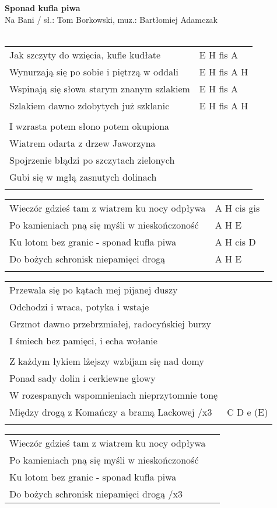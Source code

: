 \documentclass[a5paper]{article}
\begin{document}


\noindent
\fontsize{12pt}{15pt}\selectfont
\textbf{Sponad kufla piwa} \\
\fontsize{8pt}{10pt}\selectfont
Na Bani / sł.: Tom Borkowski, muz.: Bartłomiej Adamczak\\ \\
\fontsize{10pt}{12pt}\selectfont
{}
\begin{tabular}{@{}p{8.50cm}p{3cm}@{}}
\noindent
Jak szczyty do wzięcia, kufle kudłate & E H fis A \\
Wynurzają się po sobie i piętrzą w oddali & E H fis A H \\
Wspinają się słowa starym znanym szlakiem & E H fis A \\
Szlakiem dawno zdobytych już szklanic & E H fis A H \\ \\

I wzrasta potem słono potem okupiona \\
Wiatrem odarta z drzew Jaworzyna \\
Spojrzenie błądzi po szczytach zielonych \\
Gubi się w mgłą zasnutych dolinach \\ \\
\end{tabular}

\noindent
\begin{tabular}{@{}p{7.50cm}p{3cm}@{}}
Wieczór gdzieś tam z wiatrem ku nocy odpływa & A H cis gis \\
Po kamieniach pną się myśli w nieskończoność & A H E \\
Ku lotom bez granic - sponad kufla piwa	& A H cis D \\
Do bożych schronisk niepamięci drogą & A H E \\ \\
\end{tabular}

\noindent
\begin{tabular}{@{}p{8.50cm}p{3cm}@{}}
Przewala się po kątach mej pijanej duszy \\
Odchodzi i wraca, potyka i wstaje \\
Grzmot dawno przebrzmiałej, radocyńskiej burzy \\
I śmiech bez pamięci, i echa wołanie \\ \\

Z każdym łykiem lżejszy wzbijam się nad domy \\
Ponad sady dolin i cerkiewne głowy \\
W rozespanych wspomnieniach nieprzytomnie tonę \\
Między drogą z Komańczy a bramą Lackowej /x3 & C D e (E) \\ \\
\end{tabular}

\noindent
\begin{tabular}{@{}p{7.50cm}p{3cm}@{}}
Wieczór gdzieś tam z wiatrem ku nocy odpływa \\ 
Po kamieniach pną się myśli w nieskończoność \\
Ku lotom bez granic - sponad kufla piwa \\
Do bożych schronisk niepamięci drogą /x3
\end{tabular}
\end{document}
